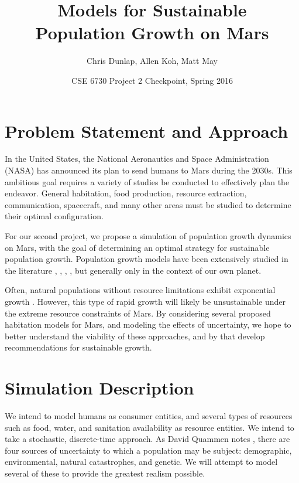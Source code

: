 \documentclass[12pt]{article}
\title{Models for Sustainable \\Population Growth on Mars}
\author{Chris Dunlap, Allen Koh, Matt May}
\date{CSE 6730 Project 2 Checkpoint, Spring 2016}
\begin{document}
\begin{titlepage}
  \maketitle
  \thispagestyle{empty}
\end{titlepage}

\newpage
  \tableofcontents
  \thispagestyle{empty}
\newpage

\section{Problem Statement and Approach}
\label{sec:problem}

In the United States, the National Aeronautics and Space Administration (NASA)
has announced its plan to send humans to Mars during the 2030s. This ambitious
goal requires a variety of studies be conducted to effectively plan the
endeavor. General habitation, food production, resource extraction,
communication, spacecraft, and many other areas must be studied to determine
their optimal configuration.

For our second project, we propose a simulation of population growth dynamics on
Mars, with the goal of determining an optimal strategy for sustainable
population growth. Population growth models have been extensively studied in the
literature \cite{clark1967population}, \cite{caswell2001matrix},
\cite{meadows1992beyond}, \cite{boserup1983population},
\cite{ehrlich1971impact} but generally only in the context of our own planet.

Often, natural populations without resource limitations exhibit exponential
growth \cite{audesirk1996biology}. However, this type of rapid growth will
likely be unsustainable under the extreme resource constraints of Mars.
By considering several proposed habitation models for Mars, and modeling the
effects of uncertainty, we hope to better understand the viability of these
approaches, and by that develop recommendations for sustainable growth.

\section{Simulation Description}
\label{sec:simdescrip}

We intend to model humans as consumer entities, and several
types of resources such as food, water, and sanitation availability as resource
entities. We intend to take a stochastic, discrete-time approach. As David
Quammen notes \cite{quammen1996song}, there are four sources of uncertainty to
which a population may be subject: demographic, environmental, natural
catastrophes, and genetic. We will attempt to model several of these to
provide the greatest realism possible.
\end{document}
